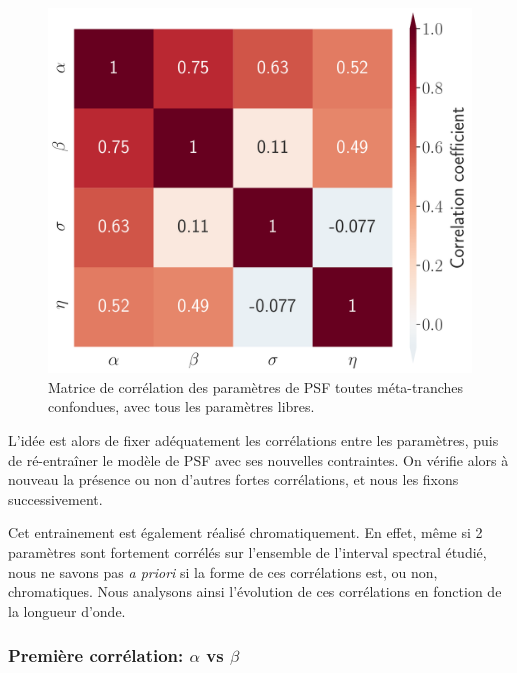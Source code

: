 \documentclass[../main/main.tex]{subfiles}
\begin{document}
\begin{figure}[ht]
  \begin{minipage}[c]{0.4\textwidth}
    \includegraphics[width=\textwidth]{../figures/06_irf/STD_correlation.pdf}
  \end{minipage}\hfill
  \begin{minipage}[c]{0.53\textwidth}
    \caption[Matrice de corrélation des paramètres de PSF.]{Matrice de
      corrélation des paramètres de PSF toutes méta-tranches confondues,
    avec tous les paramètres libres.}\label{fig:stdcorrmatrix}
  \end{minipage}
\end{figure}

L'idée est alors de fixer adéquatement les corrélations entre les
paramètres, puis de ré-entraîner le modèle de PSF avec ses nouvelles
contraintes. On vérifie alors à nouveau la présence ou non d'autres fortes
corrélations, et nous les fixons successivement.

Cet entrainement est également réalisé chromatiquement. En effet, même
si 2 paramètres sont fortement corrélés sur l'ensemble de l'interval
spectral étudié, nous ne
savons pas \textit{a priori} si la forme de ces corrélations est, ou non,
chromatiques. Nous analysons ainsi l'évolution de ces corrélations en
fonction de la longueur d'onde.

\subsubsection{Première corrélation: $\alpha$ vs $\beta$}
\end{document}
